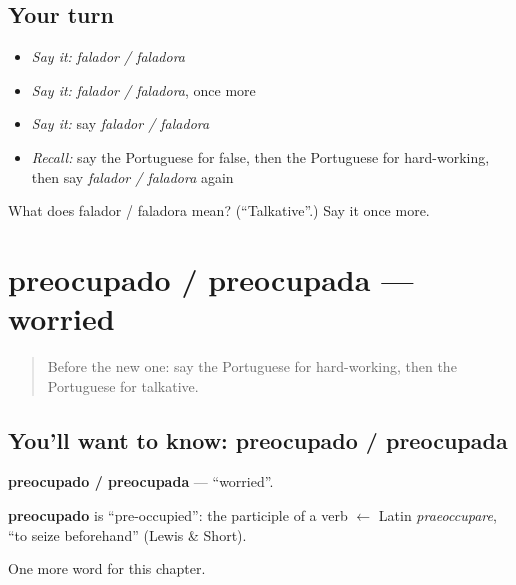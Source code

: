 \subsection*{Your turn}
\begin{itemize}
\raggedright
  \item \emph{Say it:} \emph{falador / faladora}
  \item \emph{Say it:} \emph{falador / faladora}, once more
  \item \emph{Say it:} say \emph{falador / faladora}
  \item \emph{Recall:} say the Portuguese for false, then the Portuguese for hard-working, then say \emph{falador / faladora} again
\end{itemize}

\begin{tcolorbox}[breakable,colback=teal!4,colframe=teal!35!black,title={Before you move on}]
What does falador / faladora mean? (\textquotedblleft{}Talkative\textquotedblright{}.) Say it once more.
\end{tcolorbox}
\section[preocupado / preocupada]{preocupado / preocupada — worried}

\label{lesson:PT-C187-preocupado-preocupada}



\begin{quote}
Before the new one: say the Portuguese for hard-working, then the Portuguese for talkative.
\end{quote}

\subsection*{You'll want to know: preocupado / preocupada}
\textbf{preocupado / preocupada} — \textquotedblleft{}worried\textquotedblright{}.

\begin{cousinweb}
\textbf{preocupado} is \textquotedblleft{}pre-occupied\textquotedblright{}: the participle of a verb $\leftarrow$ Latin \emph{praeoccupare}, \textquotedblleft{}to seize beforehand\textquotedblright{} (Lewis \& Short).
\end{cousinweb}

\begin{grammarlens}[title={What you've built}]
One more word for this chapter.
\end{grammarlens}

